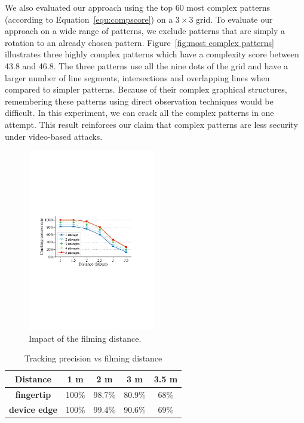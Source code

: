        We also evaluated our approach using the top 60 most complex
        patterns (according to Equation~\ref {equ:compscore}) on a $3 \times 3$
        grid.
        To evaluate our approach on a wide range of patterns, we exclude patterns that are simply a rotation to an already chosen pattern.
         Figure~\ref {fig:most complex patterns} illustrates three
        highly complex patterns which have a complexity score between 43.8 and 46.8. The three
        patterns use all the nine dots of the grid and have a larger number of line segments, intersections and overlapping lines when compared to simpler patterns.
        Because of their complex graphical structures, remembering
        these patterns using direct observation techniques would be difficult.
        In this experiment, we can crack all the complex patterns in one attempt. This result reinforces our claim that complex
        patterns are less security under video-based attacks.

        \begin{figure}[t!]
            \centering
            \includegraphics[width=0.5\textwidth]{fig/12.pdf}
            \caption{Impact of the filming distance.}
            \label{fig:fig12}
        \end{figure}

        \begin{table}[!t]
            \centering
            \caption{Tracking precision vs filming distance}
            \vspace{-0.2mm}
            \label{tab:tab1}
            \small
            \begin{tabular}{ccccc}
                \toprule
                \textbf{Distance}& 1 m & 2 m & 3 m & 3.5 m \\
                \midrule
                \textbf{fingertip}  & 100\% & 98.7\% & 80.9\% & 68\% \\
                \textbf{device edge} & 100\% & 99.4\% & 90.6\% & 69\% \\
                \bottomrule
            \end{tabular}
        \end{table}


